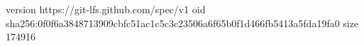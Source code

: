 version https://git-lfs.github.com/spec/v1
oid sha256:0f0f6a3848713909cbfc51ac1c5c3c23506a6f65b0f1d466fb5413a5fda19fa0
size 174916
